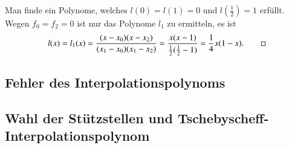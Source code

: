 \begin{beispiel}
Man finde ein Polynome, welches $l(0)=l(1)=0$ und $l(\frac12)=1$
erfüllt.
Wegen $f_0=f_2=0$ ist nur das Polynome $l_1$ zu ermitteln, es ist
\[
l(x) = l_1(x)
=
\frac{(x-x_0)(x-x_2)}{(x_1-x_0)(x_1-x_2)}
=
\frac{x(x-1)}{\frac12(\frac12-1)}
=
\frac14x(1-x).
\qedhere
\]
\end{beispiel}

%
%
\subsection{Fehler des Interpolationspolynoms
\label{buch:section:interpolation:fehler}}

%
%
\subsection{Wahl der Stützstellen und Tschebyscheff-Interpolationspolynom
\label{buch:section:interpolation:tschebyscheff}}

